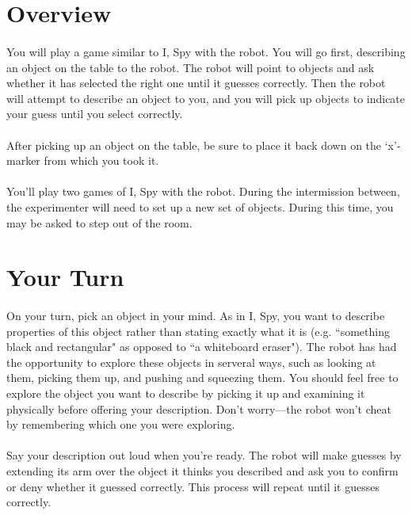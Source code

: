 \documentclass{article}
\begin{document}
\section{Overview}

\paragraph{} You will play a game similar to I, Spy with the robot. You will go first, describing an object on the table to the robot. The robot will point to objects and ask whether it has selected the right one until it guesses correctly. Then the robot will attempt to describe an object to you, and you will pick up objects to indicate your guess until you select correctly.

\paragraph{} After picking up an object on the table, be sure to place it back down on the `x'-marker from which you took it.

\paragraph{} You'll play two games of I, Spy with the robot. During the intermission between, the experimenter will need to set up a new set of objects. During this time, you may be asked to step out of the room.

\section{Your Turn}

\paragraph{} On your turn, pick an object in your mind. As in I, Spy, you want to describe properties of this object rather than stating exactly what it is (e.g. ``something black and rectangular" as opposed to ``a whiteboard eraser"). The robot has had the opportunity to explore these objects in serveral ways, such as looking at them, picking them up, and pushing and squeezing them. You should feel free to explore the object you want to describe by picking it up and examining it physically before offering your description. Don't worry---the robot won't cheat by remembering which one you were exploring.

\paragraph{} Say your description out loud when you're ready. The robot will make guesses by extending its arm over the object it thinks you described and ask you to confirm or deny whether it guessed correctly. This process will repeat until it guesses correctly.
\end{document}
